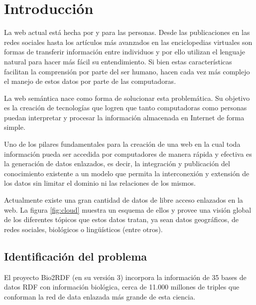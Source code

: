 
\chapter{Introducción}

La web actual está hecha por y para las personas. Desde las publicaciones en las
redes sociales hasta los artículos más avanzados en las enciclopedias virtuales
son formas de transferir información entre individuos y por ello utilizan el
lenguaje natural para hacer más fácil su entendimiento. Si bien estas
características facilitan la comprensión por parte del ser humano, hacen cada
vez más complejo el manejo de estos datos por parte de las computadoras.

La web semántica nace como forma de solucionar esta problemática. Su objetivo es
la creación de tecnologías que logren que tanto computadoras como personas
puedan interpretar y procesar la información almacenada en Internet
de forma simple.

Uno de los pilares fundamentales para la creación de una web en la cual toda
información pueda ser accedida por computadores de manera rápida y efectiva es
la generación de datos enlazados, es decir, la integración y publicación del 
conocimiento existente a un modelo que permita la interconexión y extensión de
los datos sin limitar el dominio ni las relaciones de los mismos.

Actualmente existe una gran cantidad de datos de libre acceso enlazados en la
web. La figura \ref{fig:cloud} muestra un esquema de ellos y provee una visión
global de los diferentes tópicos que estos datos tratan, ya sean datos
geográficos, de redes sociales, biológicos o lingüísticos (entre otros).

\begin{sidewaysfigure}
  \centering
  \caption{Conexiones entre las bases de datos abiertas hasta agosto del 2014.}
  \vspace{-.25cm}
  \caption*{Creado por Linked Open Data Cloud project\cite{lod:cloud}.}
  \label{fig:cloud}
\end{sidewaysfigure}

\section{Identificación del problema}

El proyecto Bio2RDF (en su versión 3) incorpora la información de 35 bases de
datos RDF con información biológica, cerca de 11.000 millones de triples que
conforman la red de data enlazada más grande de esta ciencia.

